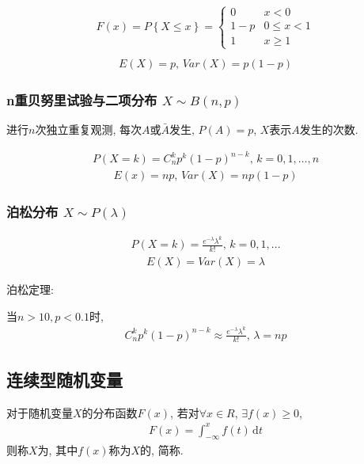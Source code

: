 \begin{align*}
    F(x)=P\left\{X\le x\right\}=\left\{ \begin{array}{lc}
        0 &x<0 \\ 1-p & 0\le x <1 \\ 1 & x\ge 1
    \end{array} \right. \\
\end{align*}
\begin{align*}
    E(X)=p,\, Var(X)=p(1-p)
\end{align*}

\subsubsection{n重贝努里试验与二项分布 \texorpdfstring{$X\sim B(n,p)$}.}
进行$n$次独立重复观测, 每次$A$或$\bar{A}$发生, $P(A)=p$, $X$表示$A$发生的次数. 

\begin{align*}
    P(X=k)=C_n^k p^k (1-p)^{n-k},\, k=0,1,\dots,n
\end{align*}
\begin{align*}
    E(x)=np,\, Var(X)=np(1-p)
\end{align*}


\subsubsection{泊松分布 \texorpdfstring{$X\sim P(\lambda)$}.}
\begin{align*}
    P(X=k)=\frac{e^{-\lambda}\lambda^k}{k!}, \, k=0,1,\dots
\end{align*}
\begin{align*}
    E(X)=Var(X)=\lambda
\end{align*}

泊松定理:
\begin{theorem}
    当$n>10, p<0.1$时, 
    \begin{align*}
        C_n^k p^k(1-p)^{n-k} \approx \frac{e^{-\lambda}\lambda^k}{k!}, \, \lambda=np
    \end{align*}
\end{theorem}

\subsection{连续型随机变量}
\begin{definition}
    对于随机变量$X$的分布函数$F(x)$, 若对$\forall x \in R$, $\exists f(x)\ge 0$, 
    \begin{align*}
        F(x)=\int_{-\infty}^{x}f(t)\,\mathrm{d}t
    \end{align*}
    则称$X$为, 其中$f(x)$称为$X$的, 简称. 
\end{definition}

